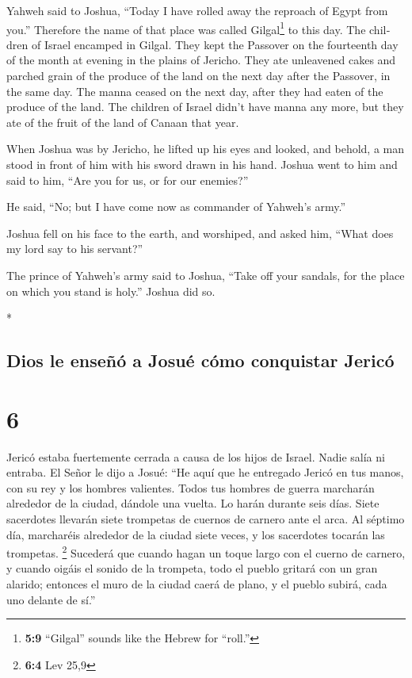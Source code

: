 \begin{paracol}{2}
\begin{otherlanguage}{english}
 Yahweh said to Joshua, ``Today I have rolled away the
reproach of Egypt from you.'' Therefore the name of that place was
called Gilgal\footnote{\textbf{5:9} ``Gilgal'' sounds like the Hebrew
  for ``roll.''} to this day.  The children of Israel
encamped in Gilgal. They kept the Passover on the fourteenth day of the
month at evening in the plains of Jericho.  They ate
unleavened cakes and parched grain of the produce of the land on the
next day after the Passover, in the same day.  The manna
ceased on the next day, after they had eaten of the produce of the land.
The children of Israel didn't have manna any more, but they ate of the
fruit of the land of Canaan that year.

 When Joshua was by Jericho, he lifted up his eyes and
looked, and behold, a man stood in front of him with his sword drawn in
his hand. Joshua went to him and said to him, ``Are you for us, or for
our enemies?''

 He said, ``No; but I have come now as commander of
Yahweh's army.''

Joshua fell on his face to the earth, and worshiped, and asked him,
``What does my lord say to his servant?''

 The prince of Yahweh's army said to Joshua, ``Take off
your sandals, for the place on which you stand is holy.'' Joshua did so.

\end{otherlanguage}

\switchcolumn[0]*

\hypertarget{dios-le-enseuxf1uxf3-a-josuuxe9-cuxf3mo-conquistar-jericuxf3}{%
\subsection{Dios le enseñó a Josué cómo conquistar
Jericó}\label{dios-le-enseuxf1uxf3-a-josuuxe9-cuxf3mo-conquistar-jericuxf3}}

\hypertarget{section-10}{%
\section{6}\label{section-10}}

 Jericó estaba fuertemente cerrada a causa de los hijos de
Israel. Nadie salía ni entraba.  El Señor le dijo a Josué:
``He aquí que he entregado Jericó en tus manos, con su rey y los hombres
valientes.  Todos tus hombres de guerra marcharán
alrededor de la ciudad, dándole una vuelta. Lo harán durante seis días.
 Siete sacerdotes llevarán siete trompetas de cuernos de
carnero ante el arca. Al séptimo día, marcharéis alrededor de la ciudad
siete veces, y los sacerdotes tocarán las trompetas. \footnote{\textbf{6:4}
  Lev 25,9}  Sucederá que cuando hagan un toque largo con
el cuerno de carnero, y cuando oigáis el sonido de la trompeta, todo el
pueblo gritará con un gran alarido; entonces el muro de la ciudad caerá
de plano, y el pueblo subirá, cada uno delante de sí.''


\end{paracol}
